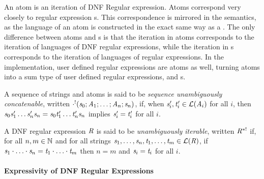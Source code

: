 \documentclass[numbers,10pt,preprint\ifanon ,nocopyrightspace\fi]{sigplanconf}
\begin{document}
An atom is an iteration of DNF Regular expression.  Atoms correspond very
closely to regular expression \StarRegexType{}s.  This correspondence is mirrored in the
semantics, as the language of an atom is constructed in the exact same way as a
\StarRegexType{}.  The only difference between atoms and \StarRegexType{}s
is that the iteration in atoms
corresponds to the iteration of languages of DNF regular expressions, while the
iteration in \StarRegexType{}s corresponds to the iteration of languages of
regular expressions.  In the implementation, user defined regular expressions
are atoms as well, turning atoms into a sum type of user defined regular
expressions, and \StarAtomType{}s.

A sequence of strings and atoms is said to be \textit{sequence unambiguously
  concatenable},
written $\cdot^!(\mathit{s}_0;\mathit{A}_1;\ldots;\mathit{A}_n;\mathit{s}_n)$,
if, when $\mathit{s}_i',\mathit{t}_i'\in\mathcal{L}(\mathit{A}_i)$ for all $i$, then
$\mathit{s}_0\mathit{s}_1'\ldots\mathit{s}_n'\mathit{s}_n=
\mathit{s}_0\mathit{t}_1'\ldots\mathit{t}_n'\mathit{s}_n$
implies $\mathit{s}_i'=\mathit{t}_i'$ for all $i$.

A DNF regular expression $\mathit{R}$ is said to be \textit{unambiguously iterable},
written $\mathit{R}^{*!}$ if,
for all $n,m\in\mathbb{N}$ and for all strings
$\mathit{s}_1,\ldots,\mathit{s}_n,\mathit{t}_1,\ldots,\mathit{t}_m\in\mathcal{L}(\mathit{R})$,
if
$\mathit{s}_1\cdot\ldots\cdot\mathit{s}_n=\mathit{t}_1\cdot\ldots\cdot\mathit{t}_m$
then $n=m$ and $\mathit{s}_i=\mathit{t}_i$ for all $i$.

\paragraph*{Expressivity of DNF Regular Expressions}
\end{document}
